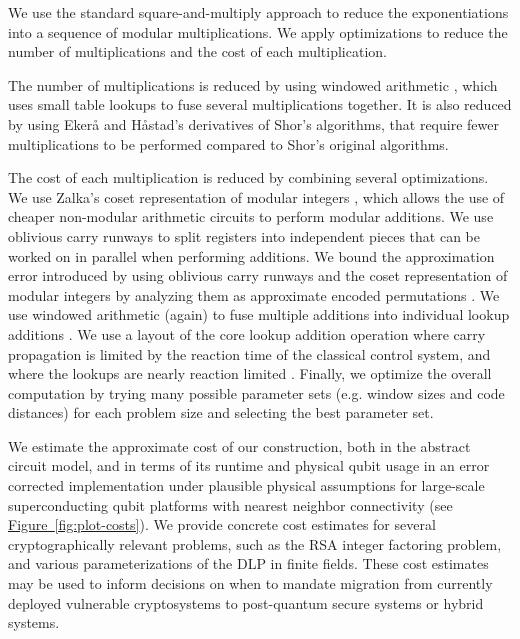 \documentclass[superscriptaddress,notitlepage,longbibliography]{revtex4-1}
\theoremstyle{definition}
\theoremstyle{definition}
\newcommand{\fig}[1]{\hyperref[fig:#1]{Figure~\ref*{fig:#1}}}
\begin{document}
We use the standard square-and-multiply approach to reduce the exponentiations into a sequence of modular multiplications.
We apply optimizations to reduce the number of multiplications and the cost of each multiplication.

The number of multiplications is reduced by using windowed arithmetic \cite{gidney2019windowedarithmetic}, which uses small table lookups to fuse several multiplications together.
It is also reduced by using Ekerå and Håstad's derivatives \cite{ekeraa2016modifying, ekeraa2017quantum, ekeraa2017pp, ekeraa2018general} of Shor's algorithms, that require fewer multiplications to be performed  compared to Shor's original algorithms.

The cost of each multiplication is reduced by combining several optimizations.
We use Zalka's coset representation of modular integers \cite{zalka2006pure}, which allows the use of cheaper non-modular arithmetic circuits to perform modular additions.
We use oblivious carry runways \cite{gidney2019approximatepermutation} to split registers into independent pieces that can be worked on in parallel when performing additions.
We bound the approximation error introduced by using oblivious carry runways and the coset representation of modular integers by analyzing them as approximate encoded permutations \cite{gidney2019approximatepermutation}.
We use windowed arithmetic (again) to fuse multiple additions into individual lookup additions \cite{gidney2019windowedarithmetic}.
We use a layout of the core lookup addition operation where carry propagation is limited by the reaction time of the classical control system, and where the lookups are nearly reaction limited \cite{gidney2019autoccz}.
Finally, we optimize the overall computation by trying many possible parameter sets (e.g. window sizes and code distances) for each problem size and selecting the best parameter set.

We estimate the approximate cost of our construction, both in the abstract circuit model, and in terms of its runtime and physical qubit usage in an error corrected implementation under plausible physical assumptions for large-scale superconducting qubit platforms with nearest neighbor connectivity (see \fig{plot-costs}).
We provide concrete cost estimates for several cryptographically relevant problems, such as the RSA integer factoring problem, and various parameterizations of the DLP in finite fields.
These cost estimates may be used to inform decisions on when to mandate migration from currently deployed vulnerable cryptosystems to post-quantum secure systems or hybrid systems.
\end{document}
